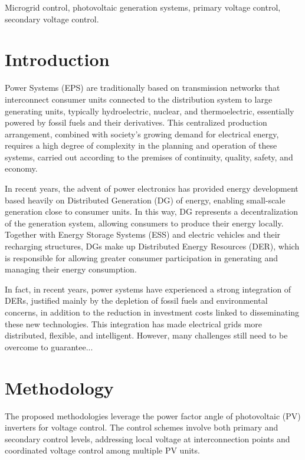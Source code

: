 \documentclass[journal]{IEEEtran}
\begin{document}
	\begin{IEEEkeywords}
		Microgrid control, photovoltaic generation systems, primary voltage control, secondary voltage control.
	\end{IEEEkeywords}
	
	\section{Introduction}
	 Power Systems (EPS) are traditionally based on transmission networks that interconnect consumer units connected to the distribution system to large generating units, typically hydroelectric, nuclear, and thermoelectric, essentially powered by fossil fuels and their derivatives. This centralized production arrangement, combined with society’s growing demand for electrical energy, requires a high degree of complexity in the planning and operation of these systems, carried out according to the premises of continuity, quality, safety, and economy.\cite{xyz} 
	  \cite{DL}
	
	In recent years, the advent of power electronics has provided energy development based heavily on Distributed Generation (DG) of energy, enabling small-scale generation close to consumer units. In this way, DG represents a decentralization of the generation system, allowing consumers to produce their energy locally. Together with Energy Storage Systems (ESS) and electric vehicles and their recharging structures, DGs make up Distributed Energy Resources (DER), which is responsible for allowing greater consumer participation in generating and managing their energy consumption.
	
	In fact, in recent years, power systems have experienced a strong integration of DERs, justified mainly by the depletion of fossil fuels and environmental concerns, in addition to the reduction in investment costs linked to disseminating these new technologies. This integration has made electrical grids more distributed, flexible, and intelligent. However, many challenges still need to be overcome to guarantee...
	
	\section{Methodology}
	The proposed methodologies leverage the power factor angle of photovoltaic (PV) inverters for voltage control. The control schemes involve both primary and secondary control levels, addressing local voltage at interconnection points and coordinated voltage control among multiple PV units.
	
\end{document}
